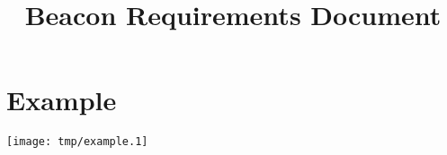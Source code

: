 \documentclass{article}
\title{Beacon Requirements Document}
\begin{document}
\maketitle

\section{Example}
\texttt{[image: tmp/example.1]}
\end{document}

